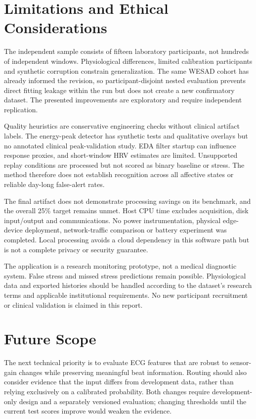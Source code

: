 \documentclass[conference,a4paper]{IEEEtran}
\newcommand{\pct}{\%}
\begin{document}
\FloatBarrier
\section{Limitations and Ethical Considerations}
The independent sample consists of fifteen laboratory participants, not hundreds of independent windows. Physiological differences, limited calibration participants and synthetic corruption constrain generalization. The same WESAD cohort has already informed the revision, so participant-disjoint nested evaluation prevents direct fitting leakage within the run but does not create a new confirmatory dataset. The presented improvements are exploratory and require independent replication.

Quality heuristics are conservative engineering checks without clinical artifact labels. The energy-peak detector has synthetic tests and qualitative overlays but no annotated clinical peak-validation study. EDA filter startup can influence response proxies, and short-window HRV estimates are limited. Unsupported replay conditions are processed but not scored as binary baseline or stress. The method therefore does not establish recognition across all affective states or reliable day-long false-alert rates.

The final artifact does not demonstrate processing savings on its benchmark, and the overall 25\pct{} target remains unmet. Host CPU time excludes acquisition, disk input/output and communications. No power instrumentation, physical edge-device deployment, network-traffic comparison or battery experiment was completed. Local processing avoids a cloud dependency in this software path but is not a complete privacy or security guarantee.

The application is a research monitoring prototype, not a medical diagnostic system. False stress and missed stress predictions remain possible. Physiological data and exported histories should be handled according to the dataset's research terms and applicable institutional requirements. No new participant recruitment or clinical validation is claimed in this report.

\section{Future Scope}
The next technical priority is to evaluate ECG features that are robust to sensor-gain changes while preserving meaningful beat information. Routing should also consider evidence that the input differs from development data, rather than relying exclusively on a calibrated probability. Both changes require development-only design and a separately versioned evaluation; changing thresholds until the current test scores improve would weaken the evidence.
\end{document}
